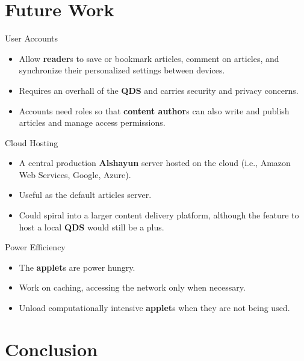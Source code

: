 \documentclass{beamer}
\begin{document}
\section{Future Work}

\begin{frame}{User Accounts}
    \begin{itemize}
        \item Allow \textbf{reader}s to save or bookmark articles, comment on
            articles, and synchronize their personalized settings between
            devices.
        \item Requires an overhall of the \textbf{QDS} and carries security and
            privacy concerns.
        \item Accounts need roles so that \textbf{content author}s can also
            write and publish articles and manage access permissions.
    \end{itemize}
\end{frame}

\begin{frame}{Cloud Hosting}
    \begin{itemize}
        \item A central production \textbf{Alshayun} server hosted on the cloud
            (i.e., Amazon Web Services, Google, Azure).
        \item Useful as the default articles server.
        \item Could spiral into a larger content delivery platform, although the
            feature to host a local \textbf{QDS} would still be a plus.
    \end{itemize}
\end{frame}

\begin{frame}{Power Efficiency}
    \begin{itemize}
        \item The \textbf{applet}s are power hungry.
        \item Work on caching, accessing the network only when necessary.
        \item Unload computationally intensive \textbf{applet}s when they are
            not being used.
    \end{itemize}
\end{frame}

\section{Conclusion}
\end{document}
